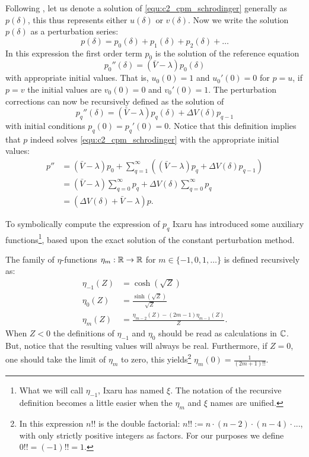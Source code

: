 Following \cite{ixaru_numerical_1984,ixaru_cp_2000}, let us denote a solution of \eqref{equ:c2_cpm_schrodinger} generally as $p(\delta)$, this thus represents either $u(\delta)$ or $v(\delta)$. Now we write the solution $p(\delta)$ as a perturbation series:
$$
    p(\delta) = p_0(\delta) + p_1(\delta) + p_2(\delta) + \dots
$$
In this expression the first order term $p_0$ is the solution of the reference equation
$$
    p_0''(\delta) = (\bar{V} - \lambda) p_0(\delta)
$$
with appropriate initial values. That is, $u_0(0) = 1$ and $u_0'(0) = 0$ for $p = u$, if $p=v$ the initial values are $v_0(0)=0$ and $v_0'(0) = 1$. The perturbation corrections can now be recursively defined as the solution of
$$
    p_q''(\delta) = (\bar{V} - \lambda) p_q(\delta) + \Delta V(\delta) p_{q-1}
$$
with initial conditions $p_q(0) = p_q'(0) = 0$. Notice that this definition implies that $p$ indeed solves \eqref{equ:c2_cpm_schrodinger} with the appropriate initial values:
\begin{align*}
    p'' & = (\bar{V} - \lambda)p_0 + \sum_{q=1}^\infty\left((\bar{V} - \lambda)p_q + \Delta V(\delta) p_{q-1}\right) \\
        & = (\bar{V} - \lambda)\sum_{q=0}^\infty p_q + \Delta V(\delta) \sum_{q=0}^\infty p_q                        \\
        & = (\Delta V(\delta) + \bar{V} - \lambda)p\text{.}
\end{align*}

To symbolically compute the expression of $p_q$ Ixaru has introduced some auxiliary functions\footnote{What we will call $\eta_{-1}$, Ixaru has named $\xi$. The notation of the recursive definition becomes a little easier when the $\eta_m$ and $\xi$ names are unified.}, based upon the exact solution of the constant perturbation method.

\begin{definition}[Ixaru 1984]\label{def:c2_eta_functions}
    The family of $\eta$-functions $\eta_m : \mathbb{R} \to \mathbb{R}$ for $m \in \{-1, 0, 1, \dots\}$ is defined recursively as:
    \begin{align*}
        \eta_{-1}(Z) & = \cosh(\sqrt{Z})                                        \\
        \eta_{0}(Z)  & = \frac{\sinh(\sqrt{Z})}{\sqrt{Z}}                       \\
        \eta_{m}(Z)  & = \frac{\eta_{m-2}(Z) - (2m-1) \eta_{m-1}(Z)}{Z}\text{.}
    \end{align*}
    When $Z < 0$ the definitions of $\eta_{-1}$ and $\eta_{0}$ should be read as calculations in $\mathbb{C}$. But, notice that the resulting values will always be real. Furthermore, if $Z = 0$, one should take the limit of $\eta_m$ to zero, this yields\footnote{In this expression $n!!$ is the double factorial: $n!! := n\cdot (n-2) \cdot (n - 4) \cdot ...$, with only strictly positive integers as factors. For our purposes we define $0!! = (-1)!! = 1$.} $\eta_m(0) = \frac{1}{(2m+1)!!}$.
\end{definition}

